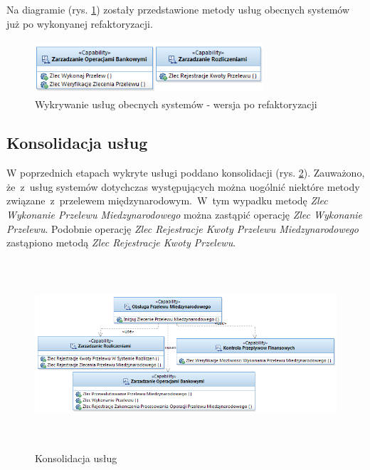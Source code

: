Na diagramie (rys. \ref{legacy_systems_service_refactored}) zostały przedstawione metody usług obecnych systemów już po wykonyanej refaktoryzacji.

\begin{figure}[h!tbp]
\begin{centering}
\includegraphics[width=8.5cm, height=2cm]{img/legacy_systems_services_refactored.png}
\caption[Wykrywanie usług obecnych systemów - wersja po refaktoryzacji]{Wykrywanie usług obecnych systemów - wersja po refaktoryzacji}\label{legacy_systems_service_refactored}
\end{centering}
\end{figure}

\subsection{Konsolidacja usług}
W poprzednich etapach wykryte usługi poddano konsolidacji (rys. \ref{services_consolidation}). Zauważono, że~z~usług systemów dotychczas występujących można uogólnić niektóre metody związane~z~przelewem międzynarodowym.~W~tym wypadku metodę \emph{Zlec Wykonanie Przelewu Miedzynarodowego} można zastąpić operację \emph{Zlec Wykonanie Przelewu}. Podobnie operację \emph{Zlec Rejestracje Kwoty Przelewu Miedzynarodowego} zastąpiono metodą \emph{Zlec Rejestracje Kwoty Przelewu}.

\begin{figure}[h!tbp]
\begin{centering}
\includegraphics[width=16cm, height=7cm]{img/consolidation_services.png}
\caption[Konsolidacja usług]{Konsolidacja usług}\label{services_consolidation}
\end{centering}
\end{figure}



